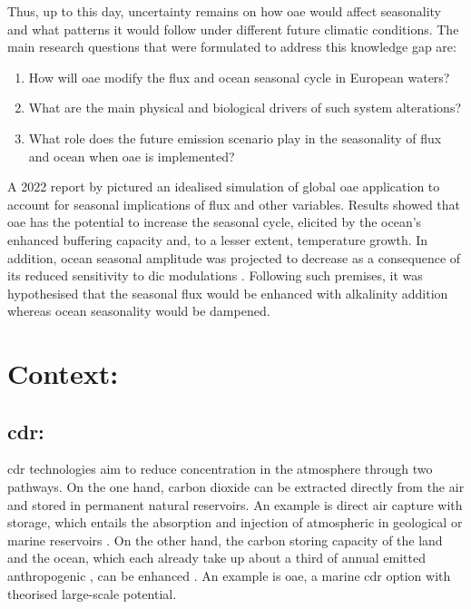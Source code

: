 Thus, up to this day, uncertainty remains on how \ac{oae} would affect  seasonality and what patterns it would follow under different future climatic conditions. The main research questions that were formulated to address this knowledge gap are:
\begin{enumerate}

  \item How will \ac{oae} modify the  flux and ocean  seasonal cycle in European waters?
  \item What are the main physical and biological drivers of such system alterations?
  \item What role does the future emission scenario play in the seasonality of  flux and ocean  when \ac{oae} is implemented?
  
\end{enumerate}

A 2022 report by \citeauthor{schwinger2022report} pictured an idealised simulation of global \ac{oae} application to account for seasonal implications of  flux and other variables. Results showed that \ac{oae} has the potential to increase the  seasonal cycle, elicited by the ocean's enhanced buffering capacity and, to a lesser extent, temperature growth. In addition, ocean  seasonal amplitude was projected to decrease as a consequence of its reduced sensitivity to \ac{dic} modulations \citep{schwinger2022report}. Following such premises, it was hypothesised that the  seasonal flux would be enhanced with alkalinity addition whereas ocean  seasonality would be dampened. 

\chapter{Context:} 

\section{\ac{cdr}:}

\acl{cdr} technologies aim to reduce  concentration in the atmosphere through two pathways. On the one hand, carbon dioxide can be extracted directly from the air and stored in permanent natural reservoirs. An example is direct air capture with  storage, which entails the absorption and injection of atmospheric  in geological or marine reservoirs \citep{pires2011recent}. On the other hand, the carbon storing capacity of the land and the ocean, which each already take up about a third of annual emitted anthropogenic , can be enhanced \citep{keller2018effects}. An example is \ac{oae}, a marine \ac{cdr} option with theorised large-scale potential.

